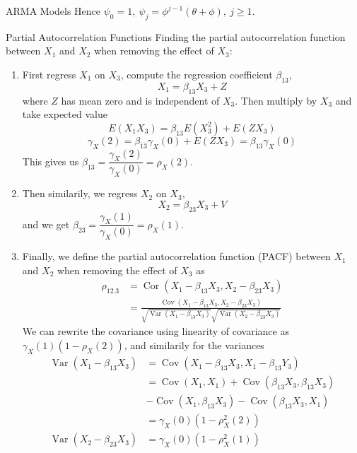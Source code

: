 \documentclass{article}
\DeclareMathOperator{\Var}{Var}
\DeclareMathOperator{\Cov}{Cov}
\DeclareMathOperator{\Cor}{Cor}
\begin{document}
\begin{multicols*}{3}
\begin{blackbox}{ARMA Models}
    Hence $\psi_0 = 1, \ \psi_j = \phi^{j-1}(\theta + \phi), \ j \geq 1$.
\end{blackbox}
\begin{blackbox}{Partial Autocorrelation Functions}
    Finding the partial autocorrelation function between $X_1$ and $X_2$ when removing the effect of $X_3$:
    \begin{enumerate}[label=\roman*), leftmargin=7pt]
        \item First regress $X_1$ on $X_3$, compute the regression coefficient $\beta_{13}$,\\[-4ex]
        \[X_1 = \beta_{13}X_3 + Z\]
        where $Z$ has mean zero and is independent of $X_3$. Then multiply by $X_3$ and take expected value\\[-1ex]
        \[E(X_1X_3) = \beta_{13}E(X_3^2) + E(ZX_3)\]
        \[\gamma_X(2) = \beta_{13}\gamma_X(0) + E(ZX_3) = \beta_{13}\gamma_X(0)\]
        This gives us $\beta_{13} = \dfrac{\gamma_X(2)}{\gamma_X(0)} = \rho_X(2)$.
        \item Then similarily, we regress $X_2$ on $X_3$, \\[-1.5ex]
        \[X_2 = \beta_{23}X_3 + V\]
        and we get $\beta_{23} = \dfrac{\gamma_X(1)}{\gamma_X(0)} = \rho_X(1)$.
        \item Finally, we define the partial autocorrelation function (PACF) between $X_1$ and $X_2$ when removing the effect of $X_3$ as
        \vspace{-1ex}
        \begin{align*}
            \rho_{12.3} &= \Cor(X_1 - \beta_{13}X_3, X_2-\beta_{23}X_3)\\
            &= \frac{\Cov(X_1 - \beta_{13}X_3, X_2 - \beta_{23}X_3)}{\sqrt{\Var(X_1-\beta_{13}X_3)}\sqrt{\Var(X_2-\beta_{23}X_3)}}  
        \end{align*}
        We can rewrite the covariance using linearity of covariance as $\gamma_X(1)(1-\rho_X(2))$, and similarily for the variances 
        \vspace{-2ex}
        \begin{align*}
            \Var(X_1 - \beta_{13}X_3) &= \Cov(X_1 - \beta_{13}X_3, X_1 - \beta_{13}Y_3)\\
            &= \Cov(X_1,X_1) + \Cov(\beta_{13}X_3,\beta_{13}X_3)\\
            &- \Cov(X_1,\beta_{13}X_3) - \Cov(\beta_{13}X_3,X_1)\\
            &= \gamma_X(0)(1-\rho_X^2(2))\\
            \Var(X_2 - \beta_{23}X_3) &= \gamma_X(0)(1- \rho_X^2(1))

\end{align*}
\end{enumerate}
\end{blackbox}
\end{multicols*}
\end{document}
